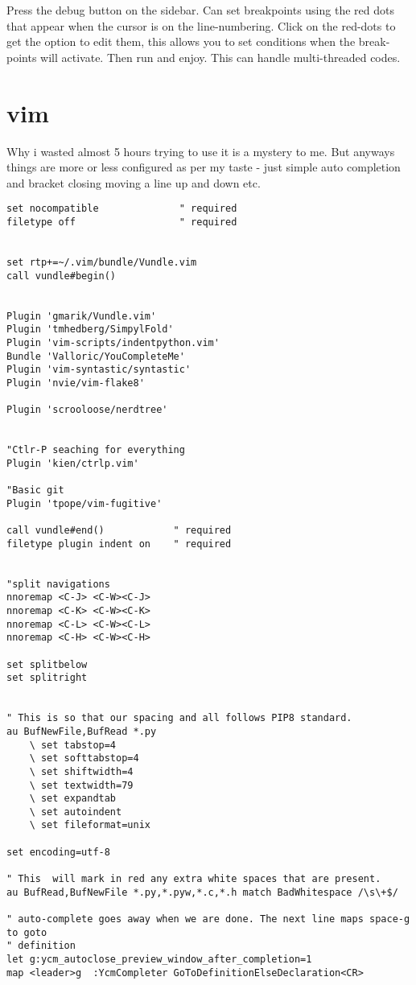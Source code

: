 Press the debug button on the sidebar. Can set breakpoints using the red dots that appear when the cursor is on the line-numbering. Click on the red-dots to get the option to edit them, this allows you to set conditions when the break-points will activate. Then run and enjoy. This can handle multi-threaded codes.



\section{vim}

Why i wasted almost 5 hours trying to use it is a mystery to me. But anyways things are more or less configured as per my taste - just simple auto completion and bracket closing moving a line up and down etc.

\begin{lstlisting}
set nocompatible              " required
filetype off                  " required


set rtp+=~/.vim/bundle/Vundle.vim
call vundle#begin()


Plugin 'gmarik/Vundle.vim'
Plugin 'tmhedberg/SimpylFold'
Plugin 'vim-scripts/indentpython.vim'
Bundle 'Valloric/YouCompleteMe'
Plugin 'vim-syntastic/syntastic'
Plugin 'nvie/vim-flake8'

Plugin 'scrooloose/nerdtree'


"Ctlr-P seaching for everything
Plugin 'kien/ctrlp.vim'

"Basic git 
Plugin 'tpope/vim-fugitive'

call vundle#end()            " required
filetype plugin indent on    " required


"split navigations
nnoremap <C-J> <C-W><C-J>
nnoremap <C-K> <C-W><C-K>
nnoremap <C-L> <C-W><C-L>
nnoremap <C-H> <C-W><C-H>

set splitbelow
set splitright


" This is so that our spacing and all follows PIP8 standard.
au BufNewFile,BufRead *.py
    \ set tabstop=4
    \ set softtabstop=4
    \ set shiftwidth=4
    \ set textwidth=79
    \ set expandtab
    \ set autoindent
    \ set fileformat=unix

set encoding=utf-8

" This  will mark in red any extra white spaces that are present.
au BufRead,BufNewFile *.py,*.pyw,*.c,*.h match BadWhitespace /\s\+$/

" auto-complete goes away when we are done. The next line maps space-g to goto
" definition
let g:ycm_autoclose_preview_window_after_completion=1
map <leader>g  :YcmCompleter GoToDefinitionElseDeclaration<CR>



\end{lstlisting}
